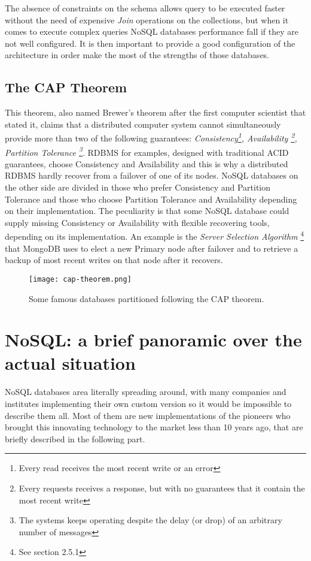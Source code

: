 The absence of constraints on the schema allows query to be executed faster without the need of expensive \textit{Join} operations on the collections, but when it comes to execute complex queries NoSQL databases performance fall if they are not well configured.
It is then important to provide a good configuration of the architecture in order make the most of the strengths of those databases.




\subsection{The CAP Theorem}
This theorem, also named Brewer's theorem after the first computer scientist that stated it, claims that a distributed computer system cannot simultaneously provide more than two of the following guarantees: \textit{Consistency\footnote {Every read receives the most recent write or an error}, Availability \footnote{Every requests receives a response, but with no guarantees that it contain the most recent write}, Partition Tolerance \footnote{The systems keeps operating despite the delay (or drop) of an arbitrary number of messages }}.
RDBMS for examples, designed with traditional ACID guarantees, choose Consistency and Availability and this is why a distributed RDBMS hardly recover from a failover of one of its nodes.
NoSQL databases on the other side are divided in those who prefer Consistency and Partition Tolerance and those who choose Partition Tolerance and Availability depending on their implementation. The peculiarity is that some NoSQL database could supply missing Consistency or Availability with flexible recovering tools, depending on its implementation. An example is the \textit{ Server Selection Algorithm} \footnote{See section 2.5.1} that MongoDB uses to elect a new Primary node after failover and to retrieve a backup of most recent writes on that node after it recovers.
\begin{figure}[H]
\texttt{[image: cap-theorem.png]}
\centering
\caption{Some famous databases partitioned following the CAP theorem.} 
\end{figure}



\section {NoSQL: a brief panoramic over the actual situation}
NoSQL databases area literally spreading around, with many companies and institutes implementing their own custom version so it would be impossible to describe them all. 
Most of them are new implementations of the pioneers who brought this innovating technology to the market less than 10 years ago, that are briefly described in the following part.

